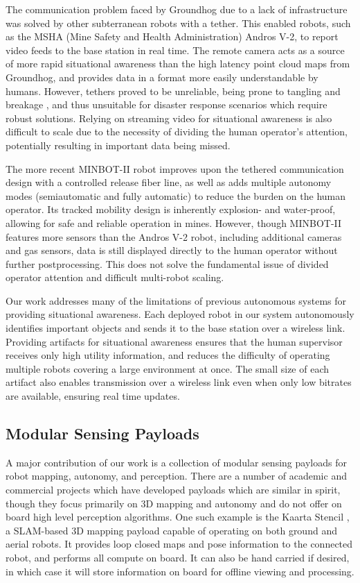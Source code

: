 The communication problem faced by Groundhog due to a lack of infrastructure was solved by other subterranean robots with a tether. This enabled robots, such as the MSHA (Mine Safety and Health Administration) Andros V-2, to report video feeds to the base station in real time. The remote camera acts as a source of more rapid situational awareness than the high latency point cloud maps from Groundhog, and provides data in a format more easily understandable by humans. However, tethers proved to be unreliable, being prone to tangling and breakage \cite{murphy2009mobile}, and thus unsuitable for disaster response scenarios which require robust solutions. Relying on streaming video for situational awareness is also difficult to scale due to the necessity of dividing the human operator's attention, potentially resulting in important data being missed.

The more recent MINBOT-II \cite{wang2014development} robot improves upon the tethered communication design with a controlled release fiber line, as well as adds multiple autonomy modes (semiautomatic and fully automatic) to reduce the burden on the human operator. Its tracked mobility design is inherently explosion- and water-proof, allowing for safe and reliable operation in mines. However, though MINBOT-II features more sensors than the Andros V-2 robot, including additional cameras and gas sensors, data is still displayed directly to the human operator without further postprocessing. This does not solve the fundamental issue of divided operator attention and difficult multi-robot scaling.

Our work addresses many of the limitations of previous autonomous systems for providing situational awareness. Each deployed robot in our system autonomously identifies important objects and sends it to the base station over a wireless link. Providing artifacts for situational awareness ensures that the human supervisor receives only high utility information, and reduces the difficulty of operating multiple robots covering a large environment at once. The small size of each artifact also enables transmission over a wireless link even when only low bitrates are available, ensuring real time updates.

\subsection{Modular Sensing Payloads}

A major contribution of our work is a collection of modular sensing payloads for robot mapping, autonomy, and perception. There are a number of academic and commercial projects which have developed payloads which are similar in spirit, though they focus primarily on 3D mapping and autonomy and do not offer on board high level perception algorithms. One such example is the Kaarta Stencil \cite{kaarta}, a SLAM-based 3D mapping payload capable of operating on both ground and aerial robots. It provides loop closed maps and pose information to the connected robot, and performs all compute on board. It can also be hand carried if desired, in which case it will store information on board for offline viewing and processing. 

